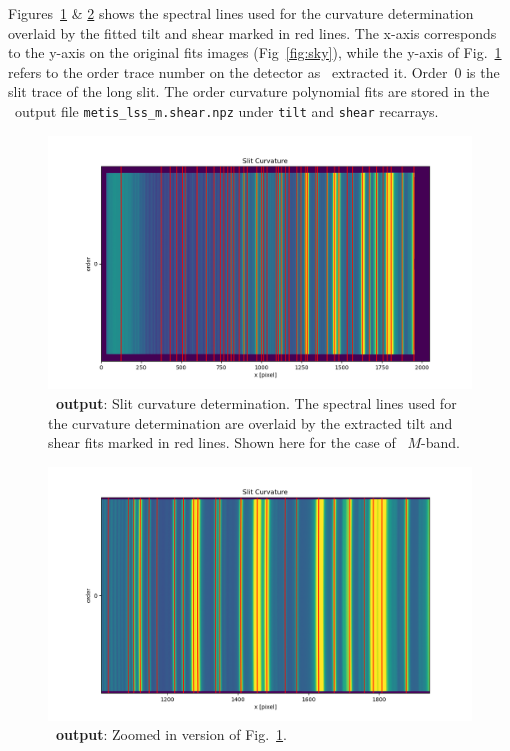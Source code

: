 Figures~\ref{fig:fig10} \& \ref{fig:fig10_z} shows the spectral lines used for the curvature determination  overlaid by the fitted tilt and shear marked in red lines. The x-axis corresponds to the y-axis on the original fits images (Fig~\ref{fig:sky}), while the y-axis of Fig.~\ref{fig:fig10} refers to the order trace number on the detector as \pyred~extracted it. Order~0 is the slit trace of the long slit. The order curvature polynomial fits are stored in the \pyred~output file \texttt{metis\_lss\_m.shear.npz} under \texttt{tilt} and \texttt{shear} recarrays.
\begin{figure}[!ht]
  \centering
  \includegraphics[width=\textwidth]{figures/LSS_CrtAlg_files/Figure_10.png}
  \caption[PyReduce slit curvature determination]{\textbf{\pyred~output}: Slit curvature determination. The spectral lines used for the curvature determination are overlaid by the extracted tilt and shear fits marked in red lines. Shown here for the case of \lss~$M$-band.}
  \label{fig:fig10}
\end{figure}
\begin{figure}[!ht]
  \centering
  \includegraphics[width=\textwidth]{figures/LSS_CrtAlg_files/Figure_10_z.png}
  \caption[PyReduce slit curvature determination - zoom in]{\textbf{\pyred~output}: Zoomed in version of Fig.~\ref{fig:fig10}.}
  \label{fig:fig10_z}
\end{figure}
